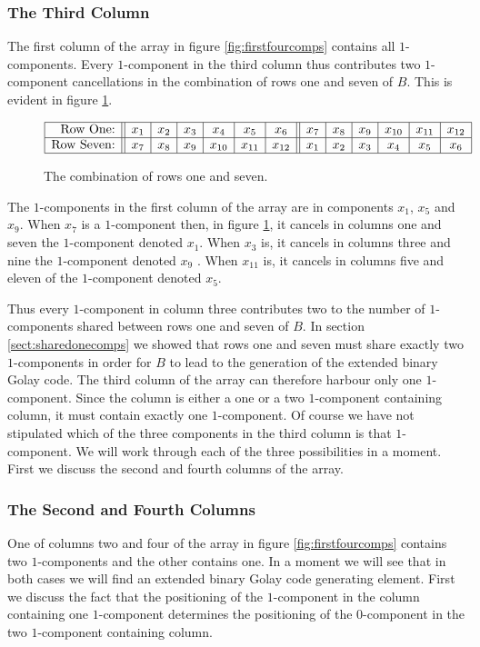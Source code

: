\subsubsection{The Third Column}
The first column of the array in figure \ref{fig:firstfourcomps} contains all $1$-components.
Every $1$-component in the third column thus contributes two $1$-component cancellations in the combination of rows one and seven of $B$.
This is evident in figure \ref{fig:rowsoneseven}.
\begin{figure}
\begin{center}
$\begin{array}{|r||c|c|c|c|c|c||c|c|c|c|c|c|}
	\hline
	\textrm{Row One:}   & x_{ 1} & x_{ 2} & x_{ 3} & x_{ 4} & x_{ 5} & x_{ 6} & x_{ 7} & x_{ 8} & x_{ 9} & x_{10} & x_{11} & x_{12} \\
	\hline
	\textrm{Row Seven:} & x_{ 7} & x_{ 8} & x_{ 9} & x_{10} & x_{11} & x_{12} & x_{ 1} & x_{ 2} & x_{ 3} & x_{ 4} & x_{ 5} & x_{ 6} \\
	\hline
\end{array}$
\caption{The combination of rows one and seven.}
\label{fig:rowsoneseven}
\end{center}
\end{figure}
The $1$-components in the first column of the array are in components $x_1$, $x_5$  and $x_9$.
When $x_7$ is a $1$-component then, in figure \ref{fig:rowsoneseven}, it cancels in columns one and seven the $1$-component denoted $x_1$.
When $x_3$ is, it cancels in columns three and nine the $1$-component denoted $x_9$ .
When $x_{11}$ is, it cancels in columns five and eleven of the $1$-component denoted $x_5$.

Thus every $1$-component in column three contributes two to the number of $1$-components shared between rows one and seven of $B$.
In section \ref{sect:sharedonecomps} we showed that rows one and seven must share exactly two $1$-components in order for $B$ to lead to the generation of the extended binary Golay code.
The third column of the array can therefore harbour only one $1$-component.
Since the column is either a one or a two $1$-component containing column, it must contain exactly one $1$-component.
Of course we have not stipulated which of the three components in the third column is that $1$-component.
We will work through each of the three possibilities in a moment.
First we discuss the second and fourth columns of the array.

\subsubsection{The Second and Fourth Columns}
One of columns two and four of the array in figure \ref{fig:firstfourcomps} contains two $1$-components and the other contains one.
In a moment we will see that in both cases we will find an extended binary Golay code generating element.
First we discuss the fact that the positioning of the $1$-component in the column containing one $1$-component determines the positioning of the $0$-component in the two $1$-component containing column.

